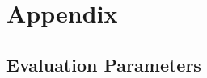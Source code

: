 \chapter{Appendix}
\label{appendix}

\section{Evaluation Parameters}
\label{sec:eval_param}



\newpage
